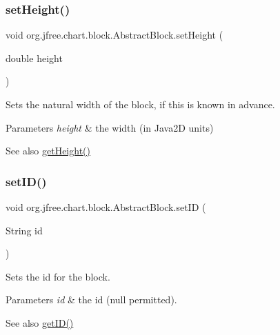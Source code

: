 \subsubsection{\texorpdfstring{set\+Height()}{setHeight()}}
{\footnotesize\ttfamily void org.\+jfree.\+chart.\+block.\+Abstract\+Block.\+set\+Height (\begin{DoxyParamCaption}\item[{double}]{height }\end{DoxyParamCaption})}

Sets the natural width of the block, if this is known in advance.


\begin{DoxyParams}{Parameters}
{\em height} & the width (in Java2D units)\\
\hline
\end{DoxyParams}
\begin{DoxySeeAlso}{See also}
\mbox{\hyperlink{classorg_1_1jfree_1_1chart_1_1block_1_1_abstract_block_a29c5a029ad8b86eca5f234b61ab307be}{get\+Height()}} 
\end{DoxySeeAlso}
\mbox{\label{classorg_1_1jfree_1_1chart_1_1block_1_1_abstract_block_a26268ae74a9bb05e1af266f8da1e849a}} 
\subsubsection{\texorpdfstring{set\+I\+D()}{setID()}}
{\footnotesize\ttfamily void org.\+jfree.\+chart.\+block.\+Abstract\+Block.\+set\+ID (\begin{DoxyParamCaption}\item[{String}]{id }\end{DoxyParamCaption})}

Sets the id for the block.


\begin{DoxyParams}{Parameters}
{\em id} & the id ({\ttfamily null} permitted).\\
\hline
\end{DoxyParams}
\begin{DoxySeeAlso}{See also}
\mbox{\hyperlink{classorg_1_1jfree_1_1chart_1_1block_1_1_abstract_block_a81378f2ce87b2bab348e8cab684cf6d1}{get\+I\+D()}} 
\end{DoxySeeAlso}
\mbox{\label{classorg_1_1jfree_1_1chart_1_1block_1_1_abstract_block_abbb2d7a0c7ccb9cd38d62aa00654903d}} 
